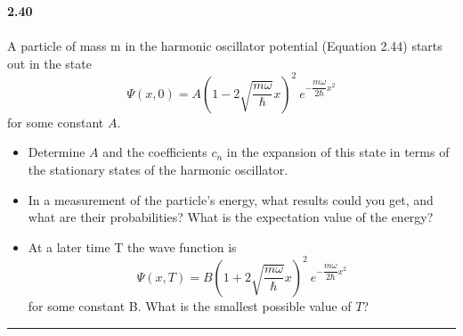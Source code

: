 \documentclass[fleqn]{article}
\begin{document}
  \textbf{2.40} \\ \\
  A particle of mass m in the harmonic oscillator potential (Equation 2.44) starts out in the state
  $$\Psi(x,0)=A \left(1-2\sqrt{\dfrac{m \omega}{\hbar}}x\right)^2 ~ e^{-\dfrac{m\omega}{2\hbar} x^2}$$
  for some constant $A$.
  \begin{itemize}
    \item Determine $A$ and the coefficients $c_n$ in the expansion of this state in terms
    of the stationary states of the harmonic oscillator.

    \item In a measurement of the particle’s energy, what results could you get, and
    what are their probabilities? What is the expectation value of the energy?

    \item At a later time T the wave function is
    $$\Psi(x,T)=B\left(1+2\sqrt{\dfrac{m \omega}{\hbar}}x\right)^2 ~ e^{-\dfrac{m\omega}{2\hbar} x^2}$$
    for some constant B. What is the smallest possible value of $T$?
  \end{itemize}


  \rule{15cm}{1pt}
  
\end{document}
